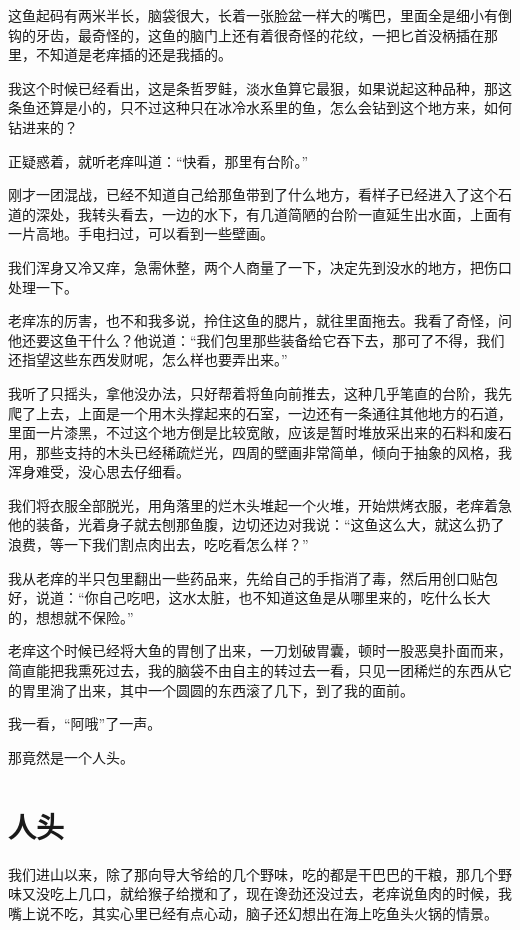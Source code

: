 这鱼起码有两米半长，脑袋很大，长着一张脸盆一样大的嘴巴，里面全是细小有倒钩的牙齿，最奇怪的，这鱼的脑门上还有着很奇怪的花纹，一把匕首没柄插在那里，不知道是老痒插的还是我插的。

我这个时候已经看出，这是条哲罗鲑，淡水鱼算它最狠，如果说起这种品种，那这条鱼还算是小的，只不过这种只在冰冷水系里的鱼，怎么会钻到这个地方来，如何钻进来的？

正疑惑着，就听老痒叫道：“快看，那里有台阶。”

刚才一团混战，已经不知道自己给那鱼带到了什么地方，看样子已经进入了这个石道的深处，我转头看去，一边的水下，有几道简陋的台阶一直延生出水面，上面有一片高地。手电扫过，可以看到一些壁画。

我们浑身又冷又痒，急需休整，两个人商量了一下，决定先到没水的地方，把伤口处理一下。

老痒冻的厉害，也不和我多说，拎住这鱼的腮片，就往里面拖去。我看了奇怪，问他还要这鱼干什么？他说道：“我们包里那些装备给它吞下去，那可了不得，我们还指望这些东西发财呢，怎么样也要弄出来。”

我听了只摇头，拿他没办法，只好帮着将鱼向前推去，这种几乎笔直的台阶，我先爬了上去，上面是一个用木头撑起来的石室，一边还有一条通往其他地方的石道，里面一片漆黑，不过这个地方倒是比较宽敞，应该是暂时堆放采出来的石料和废石用，那些支持的木头已经稀疏烂光，四周的壁画非常简单，倾向于抽象的风格，我浑身难受，没心思去仔细看。

我们将衣服全部脱光，用角落里的烂木头堆起一个火堆，开始烘烤衣服，老痒着急他的装备，光着身子就去刨那鱼腹，边切还边对我说：“这鱼这么大，就这么扔了浪费，等一下我们割点肉出去，吃吃看怎么样？”

我从老痒的半只包里翻出一些药品来，先给自己的手指消了毒，然后用创口贴包好，说道：“你自己吃吧，这水太脏，也不知道这鱼是从哪里来的，吃什么长大的，想想就不保险。”

老痒这个时候已经将大鱼的胃刨了出来，一刀划破胃囊，顿时一股恶臭扑面而来，简直能把我熏死过去，我的脑袋不由自主的转过去一看，只见一团稀烂的东西从它的胃里淌了出来，其中一个圆圆的东西滚了几下，到了我的面前。

我一看，“阿哦”了一声。

那竟然是一个人头。

\chapter{人头}

我们进山以来，除了那向导大爷给的几个野味，吃的都是干巴巴的干粮，那几个野味又没吃上几口，就给猴子给搅和了，现在谗劲还没过去，老痒说鱼肉的时候，我嘴上说不吃，其实心里已经有点心动，脑子还幻想出在海上吃鱼头火锅的情景。

